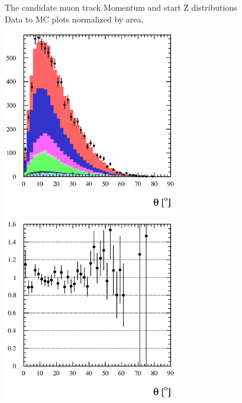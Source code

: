 \begin{figure}[h]
  \caption{The candidate muon track Momentum and start Z distributions 
Data to MC plots normalized by area.}
  \label{fig:ResultsNorm}%
\end{figure}

\begin{figure}[h]
  \centering
  \includegraphics[width=3in]{Figures/P0DTrkThetaRun1Run2-normByRatio.eps}

\end{figure}
